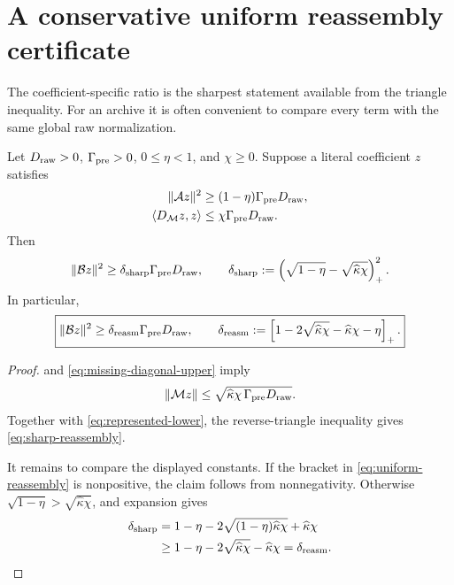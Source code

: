 \section{A conservative uniform reassembly certificate}
\label{sec:uniform-reassembly}

The coefficient-specific ratio is the sharpest statement available
from the triangle inequality.  For an archive it is often convenient
to compare every term with the same global raw normalization.

\begin{theorem}
\label{thm:raw-reassembly}
Let \(D_{\rm raw}>0\), \(\Gamma_{\rm pre}>0\),
\(0\le\eta<1\), and \(\chi\ge0\).  Suppose a literal coefficient
\(z\) satisfies
\begin{align}
 \|\mathcal A z\|^2
 &\ge(1-\eta)\Gamma_{\rm pre}D_{\rm raw},
 \label{eq:represented-lower}\\
 \langle D_{\mathcal M}z,z\rangle
 &\le\chi\Gamma_{\rm pre}D_{\rm raw}.
 \label{eq:missing-diagonal-upper}
\end{align}
Then
\begin{equation}
 \|\mathcal B z\|^2
 \ge
 \delta_{\rm sharp}\Gamma_{\rm pre}D_{\rm raw},
 \qquad
 \delta_{\rm sharp}
 :=
 \left(\sqrt{1-\eta}
       -\sqrt{\widehat\kappa\chi}\right)_+^2.
 \label{eq:sharp-reassembly}
\end{equation}
In particular,
\begin{equation}
 \boxed{
 \|\mathcal B z\|^2
 \ge
 \delta_{\rm reasm}\Gamma_{\rm pre}D_{\rm raw},\qquad
 \delta_{\rm reasm}
 :=
 \left[
 1-2\sqrt{\widehat\kappa\chi}
 -\widehat\kappa\chi-\eta
 \right]_+.}
 \label{eq:uniform-reassembly}
\end{equation}
\end{theorem}

\begin{proof}
 and
\eqref{eq:missing-diagonal-upper} imply
\[
 \|\mathcal M z\|
 \le
 \sqrt{\widehat\kappa\chi\,
       \Gamma_{\rm pre}D_{\rm raw}}.
\]
Together with \eqref{eq:represented-lower}, the reverse-triangle
inequality gives \eqref{eq:sharp-reassembly}.

It remains to compare the displayed constants.  If the bracket in
\eqref{eq:uniform-reassembly} is nonpositive, the claim follows from
nonnegativity.  Otherwise
\(\sqrt{1-\eta}>\sqrt{\widehat\kappa\chi}\), and expansion gives
\begin{align*}
 \delta_{\rm sharp}
 &=1-\eta
 -2\sqrt{(1-\eta)\widehat\kappa\chi}
 +\widehat\kappa\chi\\
 &\ge
 1-\eta-2\sqrt{\widehat\kappa\chi}
 -\widehat\kappa\chi
 =\delta_{\rm reasm}.
\end{align*}
\end{proof}

